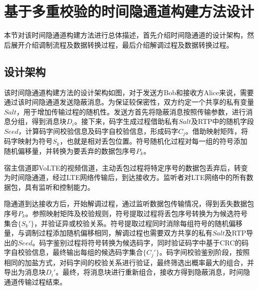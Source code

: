 \section{基于多重校验的时间隐通道构建方法设计}
\label{chap:hash:results}

本节对该时间隐通道构建方法进行总体描述，首先介绍时间隐通道的设计架构，然后展开介绍调制流程及数据转换过程，最后介绍解调过程及数据转换过程。

\subsection{设计架构}
\label{chap:hash:results:model}


该时间隐通道构建方法的设计架构如图，对于发送方Bob和接收方Alice来说，需要通过该时间隐通道发送隐蔽消息。为保证较保密性，双方约定一个共享的私有变量$Salt$，用于增加传输过程的随机性。发送方首先将隐蔽消息按照传输参数，进行消息分组，得到消息块$D_{i}$。接下来，码字生成过程借助私有$Salt$及RTP中的随机字段$Seed$，计算码字间校验信息及码字自校验信息，形成码字$C_{j}$。借助映射矩阵，将码字映射为符号$S_{k}$，也就是相对丢包位置。符号随机化过程对每一组的符号添加随机偏移量，并转换为要丢弃的数据包序号$P_{k}$。

宿主信道即VoLTE的视频信道，主动丢包过程将特定序号的数据包丢弃后，转变为时间隐通道，经过LTE网络传输后，到达接收方。监听者对LTE网络中的所有数据包，具有监听和控制能力。

隐通道到达接收方后，开始解调过程，通过监听数据包传输情况，得到丢失数据包序号$P_{k}$。参照映射矩阵及校验规则，符号提取过程将丢包序号转换为为候选符号集合$\{S_{k}'\}$，并验证异或校验关系。符号提取过程同时消除每组符号的随机偏移量，与调制过程添加随机偏移相同，解调过程也需要双方共享的私有$Salt$及RTP导出的$Seed$。码字鉴别过程将符号转换为候选码字，同时验证码字中基于CRC的码字自校验信息，最终输出每组的候选码字集合$\{C_{j}'\}$。码字间校验鉴别阶段，按照相同的加盐方式，对码字间的校验关系进行验证，最终筛选出概率最大的组合，并导出为消息块$D_{i}'$。最终，将消息块进行重新组合，接收方得到隐蔽消息，时间隐通道传输过程结束。

